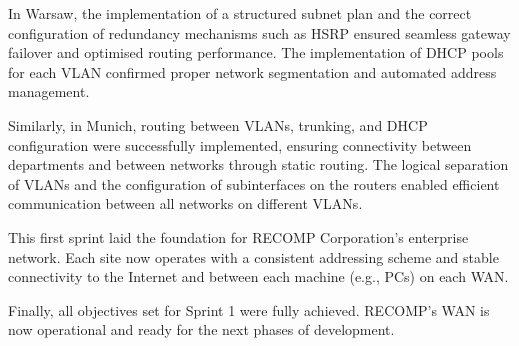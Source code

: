 \documentclass[a4paper,12pt]{report}
\begin{document}
In Warsaw, the implementation of a structured subnet plan and the correct configuration of redundancy mechanisms such as HSRP ensured seamless gateway failover and optimised routing performance. The implementation of DHCP pools for each VLAN confirmed proper network segmentation and automated address management.

Similarly, in Munich, routing between VLANs, trunking, and DHCP configuration were successfully implemented, ensuring connectivity between departments and between networks through static routing. The logical separation of VLANs and the configuration of subinterfaces on the routers enabled efficient communication between all networks on different VLANs.
 
This first sprint laid the foundation for RECOMP Corporation's enterprise network. Each site now operates with a consistent addressing scheme and stable connectivity to the Internet and between each machine (e.g., PCs) on each WAN.



Finally, all objectives set for Sprint 1 were fully achieved. RECOMP's WAN is now operational and ready for the next phases of development.


\end{document}
